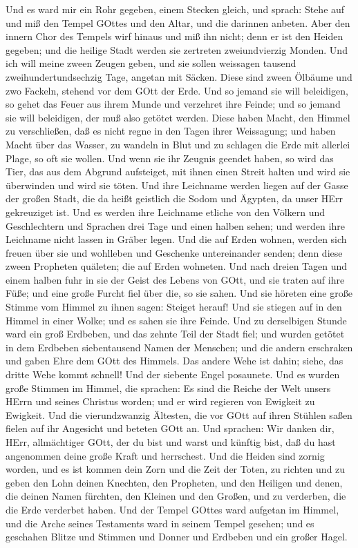  Und es ward mir ein Rohr gegeben, einem Stecken gleich, und
sprach: Stehe auf und miß den Tempel GOttes und den Altar, und die
darinnen anbeten.  Aber den innern Chor des Tempels wirf
hinaus und miß ihn nicht; denn er ist den Heiden gegeben; und die
heilige Stadt werden sie zertreten zweiundvierzig Monden. 
Und ich will meine zween Zeugen geben, und sie sollen weissagen tausend
zweihundertundsechzig Tage, angetan mit Säcken.  Diese sind
zween Ölbäume und zwo Fackeln, stehend vor dem GOtt der Erde.
 Und so jemand sie will beleidigen, so gehet das Feuer aus
ihrem Munde und verzehret ihre Feinde; und so jemand sie will
beleidigen, der muß also getötet werden.  Diese haben Macht,
den Himmel zu verschließen, daß es nicht regne in den Tagen ihrer
Weissagung; und haben Macht über das Wasser, zu wandeln in Blut und zu
schlagen die Erde mit allerlei Plage, so oft sie wollen. 
Und wenn sie ihr Zeugnis geendet haben, so wird das Tier, das aus dem
Abgrund aufsteiget, mit ihnen einen Streit halten und wird sie
überwinden und wird sie töten.  Und ihre Leichname werden
liegen auf der Gasse der großen Stadt, die da heißt geistlich die Sodom
und Ägypten, da unser HErr gekreuziget ist.  Und es werden
ihre Leichname etliche von den Völkern und Geschlechtern und Sprachen
drei Tage und einen halben sehen; und werden ihre Leichname nicht lassen
in Gräber legen.  Und die auf Erden wohnen, werden sich
freuen über sie und wohlleben und Geschenke untereinander senden; denn
diese zween Propheten quäleten; die auf Erden wohneten. 
Und nach dreien Tagen und einem halben fuhr in sie der Geist des Lebens
von GOtt, und sie traten auf ihre Füße; und eine große Furcht fiel über
die, so sie sahen.  Und sie höreten eine große Stimme vom
Himmel zu ihnen sagen: Steiget herauf! Und sie stiegen auf in den Himmel
in einer Wolke; und es sahen sie ihre Feinde.  Und zu
derselbigen Stunde ward ein groß Erdbeben, und das zehnte Teil der Stadt
fiel; und wurden getötet in dem Erdbeben siebentausend Namen der
Menschen; und die andern erschraken und gaben Ehre dem GOtt des Himmels.
 Das andere Wehe ist dahin; siehe, das dritte Wehe kommt
schnell!  Und der siebente Engel posaunete. Und es wurden
große Stimmen im Himmel, die sprachen: Es sind die Reiche der Welt
unsers HErrn und seines Christus worden; und er wird regieren von
Ewigkeit zu Ewigkeit.  Und die vierundzwanzig Ältesten, die
vor GOtt auf ihren Stühlen saßen fielen auf ihr Angesicht und beteten
GOtt an.  Und sprachen: Wir danken dir, HErr, allmächtiger
GOtt, der du bist und warst und künftig bist, daß du hast angenommen
deine große Kraft und herrschest.  Und die Heiden sind
zornig worden, und es ist kommen dein Zorn und die Zeit der Toten, zu
richten und zu geben den Lohn deinen Knechten, den Propheten, und den
Heiligen und denen, die deinen Namen fürchten, den Kleinen und den
Großen, und zu verderben, die die Erde verderbet haben. 
Und der Tempel GOttes ward aufgetan im Himmel, und die Arche seines
Testaments ward in seinem Tempel gesehen; und es geschahen Blitze und
Stimmen und Donner und Erdbeben und ein großer Hagel.

